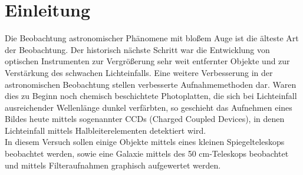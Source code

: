 \section{Einleitung}
Die Beobachtung astronomischer Phänomene mit bloßem Auge ist die älteste Art der Beobachtung. Der historisch nächste Schritt war die Entwicklung von optischen Instrumenten zur Vergrößerung sehr weit entfernter Objekte und zur Verstärkung des schwachen Lichteinfalls. Eine weitere Verbesserung in der astronomischen Beobachtung stellen verbesserte Aufnahmemethoden dar. Waren dies zu Beginn noch chemisch beschichtete Photoplatten, die sich bei Lichteinfall ausreichender Wellenlänge dunkel verfärbten, so geschieht das Aufnehmen eines Bildes heute mittels sogenannter CCDs (Charged Coupled Devices), in denen Lichteinfall mittels Halbleiterelementen detektiert wird. \\
In diesem Versuch sollen einige Objekte mittels eines kleinen Spiegelteleskops beobachtet werden, sowie eine Galaxie mittels des 50 cm-Teleskops beobachtet und mittels Filteraufnahmen graphisch aufgewertet werden.  